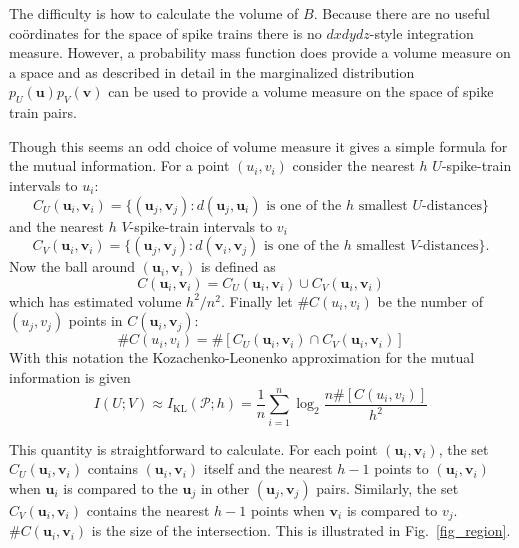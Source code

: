 \documentclass[12pt]{article}
\renewcommand{\u}{\mathbf{u}}
\renewcommand{\v}{\mathbf{v}}
\begin{document}
The difficulty is how to calculate the volume of $B$. Because there
are no useful co\"{o}rdinates for the space of spike trains there is no
$dxdydz$-style integration measure. However, a probability
mass function does provide a volume measure on a space and as
described in detail in \citet{Houghton2015} the marginalized
distribution $p_U(\u)p_V(\v)$ can be used to provide a volume measure
on the space of spike train pairs.

Though this seems an odd choice of volume measure it gives a simple
formula for the mutual information. For a point $(u_i,v_i)$ consider
the nearest $h$ $U$-spike-train intervals to $u_i$:
\begin{equation}
C_U(\u_i,\v_i)=\{(\u_j,\v_j): d(\u_j,\u_i)\mbox{ is one of the }h\mbox{ smallest $U$-distances} \}
\end{equation}
and the nearest $h$ $V$-spike-train intervals to $v_i$
\begin{equation}
C_V(\u_i,\v_i)=\{(\u_j,\v_j): d(\v_i,\v_j)\mbox{ is one of the }h\mbox{ smallest $V$-distances}\}.
\end{equation}
Now the ball around $(\u_i,\v_i)$ is defined as
\begin{equation}
C(\u_i,\v_i)=C_U(\u_i,\v_i)\cup C_V(\u_i,\v_i)
\end{equation}
which has estimated volume $h^2/n^2$. Finally let $\#C(u_i,v_i)$ be the
number of $(u_j,v_j)$ points in $C(\u_i,\v_j)$:
\begin{equation}
\#C(u_i,v_i)=\#[C_U(\u_i,\v_i)\cap C_V(\u_i,\v_i)]
\end{equation}
With this notation the  Kozachenko-Leonenko approximation for the mutual information is given
\begin{equation}
I(U;V)\approx I_{\text{KL}}(\mathcal{P};h)=\frac{1}{n}\sum_{i=1}^n\log_2{\frac{n\#[C(u_i,v_i)]}{h^2}}
\end{equation}

This quantity is straightforward to calculate. For each point
$(\u_i,\v_i)$, the set $C_U(\u_i,\v_i)$ contains $(\u_i,\v_i)$ itself
and the nearest $h-1$ points to $(\u_i,\v_i)$ when $\u_i$ is compared
to the $\u_j$ in other $(\u_j,\v_j)$ pairs. Similarly, the set
$C_V(\u_i,\v_i)$ contains the nearest $h-1$ points when $\v_i$ is
compared to $v_j$. $\#C(\u_i,\v_i)$ is the size of the
intersection. This is illustrated in Fig.~\ref{fig_region}.
\end{document}
